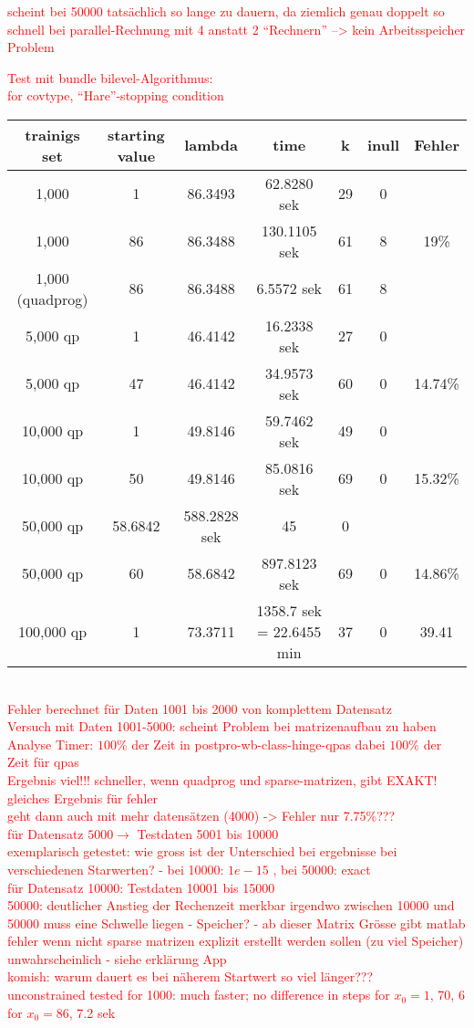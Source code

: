 \textcolor{red}{scheint bei 50000 tats\"achlich so lange zu dauern, da ziemlich genau doppelt so schnell bei parallel-Rechnung mit 4 anstatt 2 ``Rechnern'' --> kein Arbeitsspeicher Problem}

\textcolor{red}{Test mit bundle bilevel-Algorithmus:\\
for covtype, ``Hare''-stopping condition\\
\begin{tabular}{c|c|c|c|c|c|c}
trainigs set & starting value & lambda & time & k & inull & Fehler\\
\hline
1,000 & 1 & 86.3493 & 62.8280 sek & 29 & 0 & \\
1,000 & 86 & 86.3488 & 130.1105 sek & 61 & 8 & 19\% \\
1,000 (quadprog) & 86 & 86.3488 & 6.5572 sek & 61 & 8 & \\
5,000 qp & 1 & 46.4142 & 16.2338 sek & 27 & 0 & \\
5,000 qp & 47 & 46.4142 & 34.9573 sek & 60 & 0 & 14.74\% \\
10,000 qp & 1 & 49.8146 & 59.7462 sek & 49 & 0 & \\
10,000 qp & 50 & 49.8146 & 85.0816 sek & 69 & 0 & 15.32\% \\
50,000 qp & 58.6842 & 588.2828 sek & 45 & 0 & \\
50,000 qp & 60 & 58.6842 & 897.8123 sek & 69 & 0 & 14.86\% \\
100,000 qp & 1 & 73.3711 & 1358.7 sek = 22.6455 min & 37 & 0 & 39.41
\end{tabular}
\\
Fehler berechnet f\"ur Daten 1001 bis 2000 von komplettem Datensatz\\
Versuch mit Daten 1001-5000: scheint Problem bei matrizenaufbau zu haben \\
Analyse Timer: \(100\%\) der Zeit in postpro-wb-class-hinge-qpas dabei \(100\%\) der Zeit für qpas\\
Ergebnis viel!!! schneller, wenn quadprog und sparse-matrizen, gibt EXAKT! gleiches Ergebnis für fehler\\
geht dann auch mit mehr datens\"atzen (4000) -> Fehler nur 7.75\%??? \\
f\"ur Datensatz \( 5000 \to\) Testdaten 5001 bis 10000 \\
exemplarisch getestet: wie gross ist der Unterschied bei ergebnisse bei verschiedenen Starwerten? - bei 10000: \(1e-15\) , bei 50000: exact\\
f\"ur Datensatz 10000: Testdaten 10001 bis 15000 \\
50000: deutlicher Anstieg der Rechenzeit merkbar irgendwo zwischen 10000 und 50000 muss eine Schwelle liegen - Speicher? - ab dieser Matrix Gr\"osse gibt matlab fehler wenn nicht sparse matrizen explizit erstellt werden sollen (zu viel Speicher) unwahrscheinlich - siehe erkl\"arung App \\
komish: warum dauert es bei n\"aherem Startwert so viel l\"anger??? \\
unconstrained tested for 1000: much faster; no difference in steps for \(x_0 = 1\), 70, 6 for \(x_0=86\), 7.2 sek}

